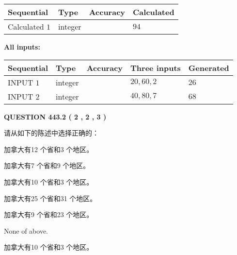 \documentclass{ctexart}
\begin{document}
  
\noindent\begin{tabular}{|l|l|l|l|}
\hline
 Sequential & Type & Accuracy & Calculated \\ 
\hline
 
 
  Calculated $  1 $ & integer &  & 
  $ 94 $ 
 \\  \hline  
 \end{tabular}
   
   
   
   
\noindent\vspace{0.1in}\hspace{-0.08in} {\textbf{\Large{All inputs: }}}
   
   
  
  
\noindent\begin{tabular}{|l|l|l|l|l|}
\hline
 Sequential & Type & Accuracy & Three inputs & Generated \\ 
\hline
 
 
  INPUT $  1 $ & integer &  & $
 20
 , 
 60
 , 
 2
 $ & $ 26 $ 
 \\  \hline  
 
 
  INPUT $  2 $ & integer &  & $
 40
 , 
 80
 , 
 7
 $ & $ 68 $ 
 \\  \hline  
 \end{tabular}
   
   
  
\vspace{0.2in}
  
{\textbf{\Large{QUESTION
443.2 
 ( 2 , 2 , 3 )
}}}
  
  
请从如下的陈述中选择正确的：
 
 
加拿大有12 个省和3 个地区。
 
 
加拿大有7 个省和9 个地区。
 
 
加拿大有10 个省和3 个地区。
 
 
加拿大有25 个省和31 个地区。
 
 
加拿大有9 个省和23 个地区。
 
 
 None of above.
 
 
\noindent{}
 
 
加拿大有10 个省和3 个地区。
 
 
\noindent{}
 
\end{document}
